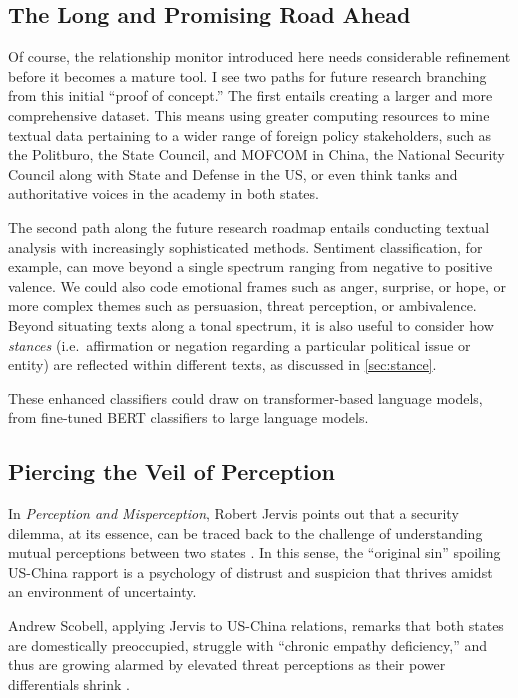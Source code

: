 \documentclass[12pt,letterpaper]{article}
\begin{document}
\subsection{The Long and Promising Road Ahead}

Of course, the relationship monitor introduced here needs considerable refinement before it becomes a mature tool. I see two paths for future research branching from this initial ``proof of concept.'' The first entails creating a larger and more comprehensive dataset. This means using greater computing resources to mine textual data pertaining to a wider range of foreign policy stakeholders, such as the Politburo, the State Council, and MOFCOM in China, the National Security Council along with State and Defense in the US, or even think tanks and authoritative voices in the academy in both states.

The second path along the future research roadmap entails conducting textual analysis with increasingly sophisticated methods. Sentiment classification, for example, can move beyond a single spectrum ranging from negative to positive valence. We could also code emotional frames such as anger, surprise, or hope, or more complex themes such as persuasion, threat perception, or ambivalence. Beyond situating texts along a tonal spectrum, it is also useful to consider how \emph{stances} (i.e.\ affirmation or negation regarding a particular political issue or entity) are reflected within different texts, as discussed in \cref{sec:stance}.

These enhanced classifiers could draw on transformer-based language models, from fine-tuned BERT classifiers to large language models.

\subsection{Piercing the Veil of Perception}

In \emph{Perception and Misperception}, Robert Jervis points out that a security dilemma, at its essence, can be traced back to the challenge of understanding mutual perceptions between two states \autocite[xv]{jervis2017}. In this sense, the ``original sin'' spoiling US-China rapport is a psychology of distrust and suspicion that thrives amidst an environment of uncertainty.

Andrew Scobell, applying Jervis to US-China relations, remarks that both states are domestically preoccupied, struggle with ``chronic empathy deficiency,'' and thus are growing alarmed by elevated threat perceptions as their power differentials shrink \autocite[664]{scobell2020}.
\end{document}
